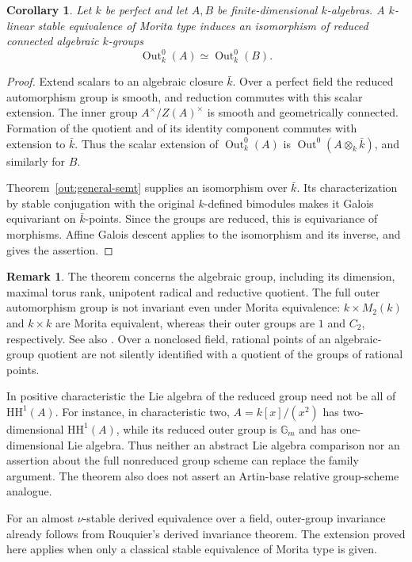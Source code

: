\documentclass[12pt,a4paper,english,reqno]{amsart}
\numberwithin{equation}{section}
\theoremstyle{plain}
\newtheorem{corollary}[theorem]{Corollary}
\theoremstyle{definition}
\newtheorem{remark}[theorem]{Remark}
\begin{document}
\begin{corollary}\label{out:perfect-field}
Let $k$ be perfect and let $A,B$ be finite-dimensional $k$-algebras.
A $k$-linear stable equivalence of Morita type induces an
isomorphism of reduced connected algebraic $k$-groups
\[
 \operatorname{Out}^0_k(A)\simeq\operatorname{Out}^0_k(B).
\]
\end{corollary}

\begin{proof}
Extend scalars to an algebraic closure $\bar k$. Over a perfect
field the reduced automorphism group is smooth, and reduction
commutes with this scalar extension. The inner group
$A^\times/Z(A)^\times$ is smooth and geometrically connected.
Formation of the quotient and of its identity component commutes
with extension to $\bar k$. Thus the scalar extension of
$\operatorname{Out}^0_k(A)$ is
$\operatorname{Out}^0(A\otimes_k\bar k)$, and similarly for $B$.

Theorem~\ref{out:general-semt} supplies an isomorphism over
$\bar k$. Its characterization by stable conjugation with the
original $k$-defined bimodules makes it Galois equivariant on
$\bar k$-points. Since the groups are reduced, this is
equivariance of morphisms. Affine Galois descent applies to
the isomorphism and its inverse, and gives the assertion.
\end{proof}

\begin{remark}\label{out:scope}
The theorem concerns the algebraic group, including its
dimension, maximal torus rank, unipotent radical and reductive
quotient. The full outer automorphism group is not invariant
even under Morita equivalence: $k\times M_2(k)$ and $k\times k$
are Morita equivalent, whereas their outer groups are $1$ and
$C_2$, respectively. See also
\cite[Remark~4.3]{Rouquier2011Automorphisms}.
Over a nonclosed field, rational points of an algebraic-group
quotient are not silently identified with a quotient of the
groups of rational points.

In positive characteristic the Lie algebra of the reduced group
need not be all of $\mathrm{HH}^1(A)$. For instance, in
characteristic two, $A=k[x]/(x^2)$ has two-dimensional
$\mathrm{HH}^1(A)$, while its reduced outer group is
$\mathbb G_m$ and has one-dimensional Lie algebra. Thus neither
an abstract Lie algebra comparison nor an assertion about the
full nonreduced group scheme can replace the family argument.
The theorem also does not assert an Artin-base relative
group-scheme analogue.

For an almost $\nu$-stable derived equivalence over a field,
outer-group invariance already follows from Rouquier's derived
invariance theorem. The extension proved here applies when only
a classical stable equivalence of Morita type is given.
\end{remark}
\end{document}
